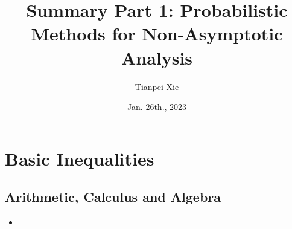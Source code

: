 \documentclass[11pt]{article}
\begin{document}
\title{Summary Part 1: Probabilistic Methods for Non-Asymptotic Analysis}
\author{ Tianpei Xie}
\date{Jan. 26th., 2023 }
\maketitle
\tableofcontents
\newpage
\section{Basic Inequalities}
\subsection{Arithmetic, Calculus and Algebra}
\begin{itemize}
\item 
\end{itemize}
\end{document}
